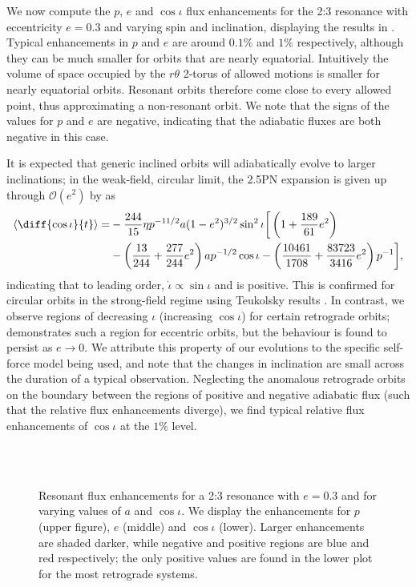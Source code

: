 We now compute the $p$, $e$ and $\cos\iota$ flux enhancements for the 2:3 resonance with eccentricity $e=0.3$ and varying spin and inclination, displaying the results in . Typical enhancements in $p$ and $e$ are around $0.1\%$ and $1\%$ respectively, although they can be much smaller for orbits that are nearly equatorial. Intuitively the volume of space occupied by the $r\theta$ 2-torus of allowed motions is smaller for nearly equatorial orbits. Resonant orbits therefore come close to every allowed point, thus approximating a non-resonant orbit. We note that the signs of the values for $p$ and $e$ are negative, indicating that the adiabatic fluxes are both negative in this case.

It is expected that generic inclined orbits will adiabatically evolve to larger inclinations; in the weak-field, circular limit, the 2.5PN expansion is given up through $\mathcal{O}(e^2)$ by \citet{ganz_adiabatic_2007} as
\begin{align}
\left\langle \diff{\cos\iota}{t} \right\rangle = &-\frac{244}{15} \eta p^{-11/2} a (1-e^2)^{3/2} \sin^2\iota \bigg[\left(1+\frac{189}{61}e^2 \right)\nonumber\\
 &- \left(\frac{13}{244} + \frac{277}{244}e^2\right)a p^{-1/2}\cos\iota - \left(\frac{10461}{1708}+\frac{83723}{3416}e^2\right)p^{-1}\bigg],
\end{align}
indicating that to leading order, $\dot{\iota} \propto \sin\iota$ and is positive. This is confirmed for circular orbits in the strong-field regime using Teukolsky results \citep{hughes_evolution_2000}. In contrast, we observe regions of decreasing $\iota$ (increasing $\cos\iota$) for certain retrograde orbits;  demonstrates such a region for eccentric orbits, but the behaviour is found to persist as $e\rightarrow 0$. We attribute this property of our evolutions to the specific self-force model being used, and note that the changes in inclination are small across the duration of a typical observation. Neglecting the anomalous retrograde orbits on the boundary between the regions of positive and negative adiabatic flux (such that the relative flux enhancements diverge), we find typical relative flux enhancements of $\cos\iota$ at the $1\%$ level.

\begin{figure}[htbp]
\centering
{}\\
\\
\caption{\label{fig:res-flux-2to3-e03}Resonant flux enhancements for a 2:3 resonance with $e=0.3$ and for varying values of $a$ and $\cos\iota$. We display the enhancements for $p$ (upper figure), $e$ (middle) and $\cos\iota$ (lower). Larger enhancements are shaded darker, while negative and positive regions are blue and red respectively; the only positive values are found in the lower plot for the most retrograde systems.}
\end{figure}

